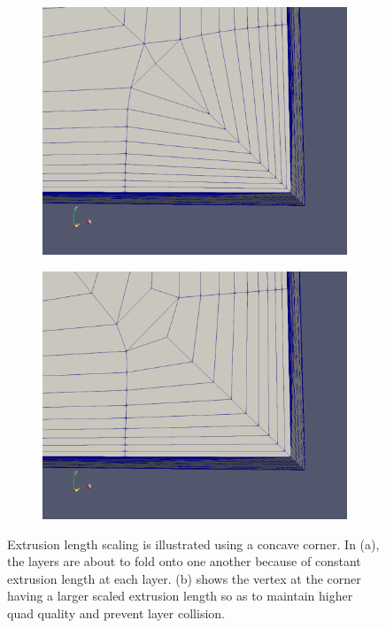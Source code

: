 \begin{figure}
\centering
\begin{subfigure}{0.5\textwidth}
\includegraphics[width = 0.9\linewidth]{img/m1/extrusionScaling/withoutScaling.png}
\caption{}
\label{subfigure-extrusionScaling1}
\centering
\end{subfigure}%
\begin{subfigure}{0.5\textwidth}
\centering
\includegraphics[width = 0.9\linewidth]{img/m1/extrusionScaling/withScaling.png}
\caption{}
\label{subfigure-extrusionScaling2}
\end{subfigure}
\caption{Extrusion length scaling is illustrated using a concave corner. In (a), the layers are about to fold onto one another because of constant extrusion length at each layer. (b) shows the vertex at the corner having a larger scaled extrusion length so as to maintain higher quad quality and prevent layer collision.}
\label{fig-extrusionScaling}
\end{figure}

